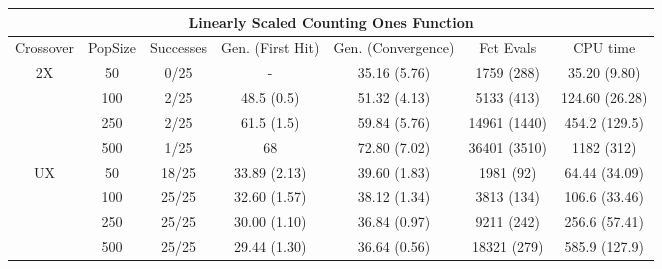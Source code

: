 \documentclass[]{scrartcl}
\begin{document}
\begin{table}
	\small
	\tabcolsep=0.09cm
	\begin{tabular}{|c|c|c|c|c|c|c|}
		\hline
		\multicolumn{7}{|c|}{Linearly Scaled Counting Ones Function}                                                     \\ \hline
		Crossover           & PopSize & Successes & Gen. (First Hit) & Gen. (Convergence) & Fct Evals    & CPU time       \\ \hline
		\multirow{4}{*}{2X} & 50      & 0/25      & -                & 35.16 (5.76)       & 1759 (288)   & 35.20 (9.80)   \\ \cline{2-7} 
		& 100     & 2/25      & 48.5 (0.5)       & 51.32 (4.13)       & 5133 (413)   & 124.60 (26.28) \\ \cline{2-7} 
		& 250     & 2/25      & 61.5 (1.5)       & 59.84 (5.76)       & 14961 (1440) & 454.2 (129.5)  \\ \cline{2-7} 
		& 500     & 1/25      & 68               & 72.80 (7.02)       & 36401 (3510) & 1182 (312)     \\ \hline
		\multirow{4}{*}{UX} & 50      & 18/25     & 33.89 (2.13)     & 39.60 (1.83)       & 1981 (92)    & 64.44 (34.09)  \\ \cline{2-7} 
		& 100     & 25/25     & 32.60 (1.57)     & 38.12 (1.34)       & 3813 (134)   & 106.6 (33.46)  \\ \cline{2-7} 
		& 250     & 25/25     & 30.00 (1.10)     & 36.84 (0.97)       & 9211 (242)   & 256.6 (57.41)  \\ \cline{2-7} 
		& 500     & 25/25     & 29.44 (1.30)     & 36.64 (0.56)       & 18321 (279)  & 585.9 (127.9)  \\ \hline
	\end{tabular}
\end{table}
\end{document}
